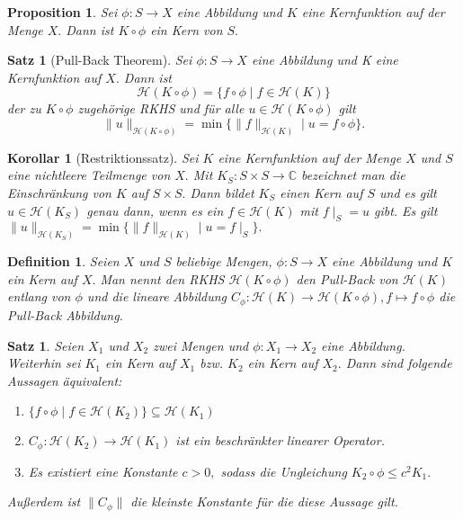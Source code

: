 \documentclass[12pt,titlepage,twoside,cleardoublepage]{article}
\theoremstyle{nummermitklammern}
\newtheorem{korollar}[temp]{Korollar}
\newtheorem{definition}[temp]{Definition}
\newtheorem{satz}[temp]{Satz}
\newtheorem{definition}[zahl]{Definition}
\newtheorem{satz}[zahl]{Satz}
\numberwithin{equation}{section}
\newtheorem{korollar}[zahl]{Korollar}
\newtheorem{proposition}[zahl]{Proposition}
\begin{document}
\begin{proposition}
Sei $\phi:S \to X $ eine Abbildung und $K$ eine Kernfunktion auf der Menge $X.$ Dann ist $K \circ \phi$ ein Kern von $S.$
\end{proposition}

\begin{satz}[Pull-Back Theorem]
Sei $\phi:S \to X$ eine Abbildung und K eine Kernfunktion auf $X.$ Dann ist 
\[
\mathcal{H}(K \circ \phi)=\{f\circ \phi \mid f \in \mathcal{H}(K)\}
\] der zu $K\circ \phi$ zugehörige RKHS und für alle $u \in \mathcal{H}(K\circ \phi)$ gilt
\[
\|u\|_{\mathcal{H}(K\circ \phi)}=\min\{\|f\|_{\mathcal{H}(K)}\mid u=f\circ \phi\}.
\]
\end{satz}

\begin{korollar}[Restriktionssatz]
Sei $K$ eine Kernfunktion auf der Menge $X$ und $S$ eine nichtleere Teilmenge von $X.$ Mit $K_S:S\times S\to \mathbb{C}$ bezeichnet man die Einschränkung von $K$ auf $S\times S.$ Dann bildet $K_S$ einen Kern auf $S$ und es gilt $u\in \mathcal{H}(K_S)$ genau dann, wenn es ein $f\in\mathcal{H}(K)$ mit $f\mid_{S}=u$ gibt.  Es gilt $\|u\|_{\mathcal{H}(K_S)}=\min\{\|f\|_{\mathcal{H}(K)}\mid u=f\mid_{S}\}.$
\end{korollar}

\begin{definition}
Seien $X$ und $S$ beliebige Mengen, $\phi:S\to X$ eine Abbildung und $K$ ein Kern auf $X.$ Man nennt den RKHS $\mathcal{H}(K\circ \phi)$ den \emph{Pull-Back} von $\mathcal{H}(K)$ entlang von $\phi$ und die lineare Abbildung $C_{\phi}:\mathcal{H}(K)\to \mathcal{H}(K\circ \phi),f\mapsto f\circ \phi$ die \emph{Pull-Back Abbildung}.   
\end{definition}


\begin{satz}
Seien $X_1$ und $X_2$ zwei Mengen und $\phi:X_1\to X_2$ eine Abbildung. Weiterhin sei $K_1$ ein Kern auf $X_1$ bzw. $K_2$ ein Kern auf $X_2.$ Dann sind folgende Aussagen äquivalent:
\begin{enumerate}
\item $\{f\circ \phi \mid f\in \mathcal{H}(K_2)\}\subseteq \mathcal{H}(K_1)$
\item $C_{\phi}:\mathcal{H}(K_2)\to \mathcal{H}(K_1) $ ist ein beschränkter linearer Operator.
\item Es existiert eine Konstante $c>0,$ sodass die Ungleichung $K_2 \circ \phi \leq c^2K_1.$ 
\end{enumerate}
Außerdem ist $\|C_{\phi}\|$ die kleinste Konstante für die diese Aussage gilt.
\end{satz}
\end{document}
